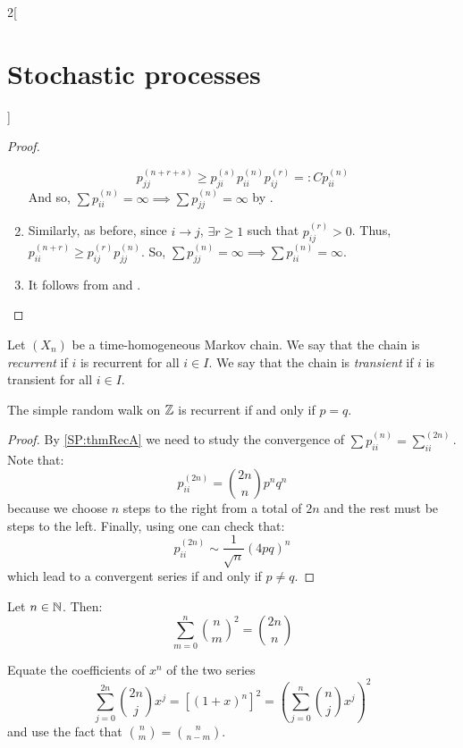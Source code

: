 \documentclass[../../../main_math.tex]{subfiles}
\begin{document}
\begin{multicols}{2}[\section{Stochastic processes}]
\begin{proof}
\begin{enumerate}
            $$
              p_{jj}^{(n+r+s)} \geq p_{ji}^{(s)}p_{ii}^{(n)}p_{ij}^{(r)}=:C p_{ii}^{(n)}
            $$
            And so, $\sum p_{ii}^{(n)}=\infty\implies \sum p_{jj}^{(n)} = \infty$ by .
      \item Similarly, as before, since $i\to j$, $\exists r\geq 1$ such that $p_{ij}^{(r)}>0$. Thus, $p_{ii}^{(n+r)}\geq p_{ij}^{(r)}p_{jj}^{(n)}$. So, $\sum p_{jj}^{(n)}=\infty\implies \sum p_{ii}^{(n)} = \infty$.
      \item It follows from  and .
    \end{enumerate}
  \end{proof}
  \begin{definition}
    Let $(X_n)$ be a time-homogeneous Markov chain. We say that the chain is \emph{recurrent} if $i$ is recurrent for all $i\in I$. We say that the chain is \emph{transient} if $i$ is transient for all $i\in I$.
  \end{definition}
  \begin{theorem}
    The simple random walk on $\mathbb{Z}$ is recurrent if and only if $p=q$.
  \end{theorem}
  \begin{proof}
    By \cref{SP:thmRecA} we need to study the convergence of $\sum p_{ii}^{(n)}=\sum_{ii}^{(2n)}$. Note that:
    \begin{equation*}
      p_{ii}^{(2n)}=\binom{2n}{n}p^nq^n
    \end{equation*}
    because we choose $n$ steps to the right from a total of $2n$ and the rest must be steps to the left. Finally, using  one can check that:
    \begin{equation}\label{SP:stirling_polya1}
      p_{ii}^{(2n)}\sim \frac{1}{\sqrt{n}}{(4pq)}^n
    \end{equation}
    which lead to a convergent series if and only if $p\ne q$.
  \end{proof}
  \begin{lemma}\label{SP:2n-n_convinatoria}
    Let $n\in\mathbb{N}$. Then:
    $$
      \sum_{m=0}^{n}\binom{n}{m}^2=\binom{2n}{n}
    $$
  \end{lemma}
  \begin{sproof}
    Equate the coefficients of $x^n$ of the two series
    $$
      \sum_{j=0}^{2n}\binom{2n}{j}x^j={[{(1+x)}^{n}]}^2={\left(\sum_{j=0}^n\binom{n}{j}x^j\right)}^2
    $$
    and use the fact that $\binom{n}{m}=\binom{n}{n-m}$.
  \end{sproof}

\end{multicols}
\end{document}
